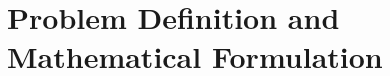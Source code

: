 \documentclass[12pt]{article}
\begin{document}





\section{Problem Definition and Mathematical Formulation}
\end{document}
